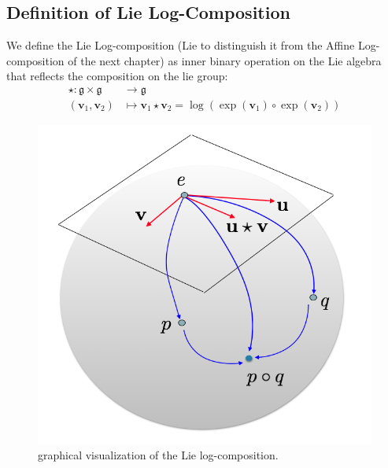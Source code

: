 \subsection{Definition of Lie Log-Composition}

We define the Lie Log-composition (Lie to distinguish it from the Affine Log-composition of the next chapter) as inner binary operation on the Lie algebra that reflects the composition on the lie group:
\begin{align*}
\star : \mathfrak{g} \times \mathfrak{g} & \longrightarrow \mathfrak{g}    \\
(\mathbf{v}_{1}, \mathbf{v}_{2}) &\longmapsto \mathbf{v}_{1}\star \mathbf{v}_{2} =  \log(\exp(\mathbf{v}_1)\circ \exp(\mathbf{v}_2))
\end{align*}

\begin{figure}[!ht]
	\centering
	\includegraphics[scale=0.35]{figures/log_composition.png}
	\caption{graphical visualization of the Lie log-composition.}
	\label{fig:composition}
\end{figure}

